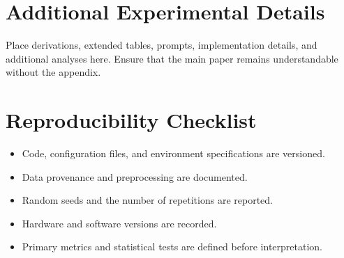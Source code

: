 \section{Additional Experimental Details}
\label{app:details}

Place derivations, extended tables, prompts, implementation details, and additional analyses here. Ensure that the main paper remains understandable without the appendix.

\section{Reproducibility Checklist}
\label{app:checklist}

\begin{itemize}[leftmargin=*]
  \item Code, configuration files, and environment specifications are versioned.
  \item Data provenance and preprocessing are documented.
  \item Random seeds and the number of repetitions are reported.
  \item Hardware and software versions are recorded.
  \item Primary metrics and statistical tests are defined before interpretation.
\end{itemize}

